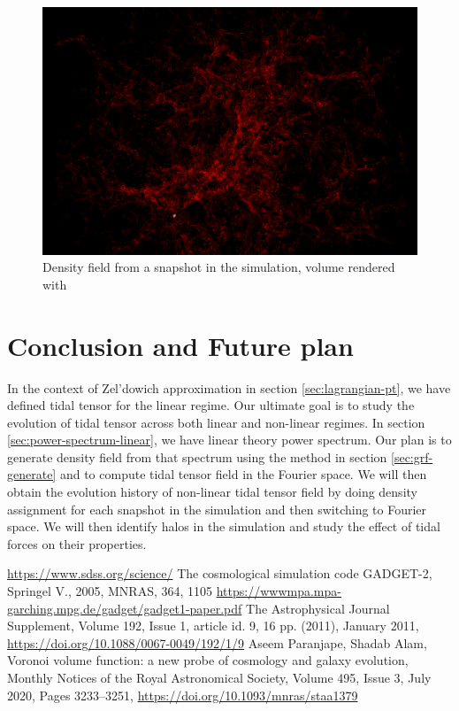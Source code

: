 \documentclass[12pt]{article}
\begin{document}
\begin{figure}[H]
	\centering
	\includegraphics[width=0.6\linewidth]{../density_assign/UniformGridData_Render_density-2}
	\caption{Density field from a snapshot in the simulation, volume rendered with \cite{yt-project}}
	\label{fig:uniformgriddatarenderdensity}
\end{figure}


\section{Conclusion and Future plan}
In the context of Zel'dowich approximation in section \ref{sec:lagrangian-pt}, we have defined tidal tensor for the linear regime. 
Our ultimate goal is to study the evolution of tidal tensor across both linear and non-linear regimes. 
In section \ref{sec:power-spectrum-linear}, we have linear theory power spectrum. Our plan is to generate density field from that spectrum using the method in section \ref{sec:grf-generate} and to compute tidal tensor field in the Fourier space. We will then obtain the evolution history of non-linear tidal tensor field by doing density assignment for each snapshot in the simulation and then switching to Fourier space. We will then identify halos in the simulation and study the effect of tidal forces on their properties.


\begin{thebibliography}{widest entry}
 \url{https://www.sdss.org/science/}
 The cosmological simulation code GADGET-2,  Springel V., 2005, MNRAS, 364, 1105 \url{https://wwwmpa.mpa-garching.mpg.de/gadget/gadget1-paper.pdf}
The Astrophysical Journal Supplement, Volume 192, Issue 1, article id. 9, 16 pp. (2011), January 2011, \url{https://doi.org/10.1088/0067-0049/192/1/9}
 Aseem Paranjape, Shadab Alam, Voronoi volume function: a new probe of cosmology and galaxy evolution, Monthly Notices of the Royal Astronomical Society, Volume 495, Issue 3, July 2020, Pages 3233–3251, \url{https://doi.org/10.1093/mnras/staa1379}
\end{thebibliography}
\end{document}
